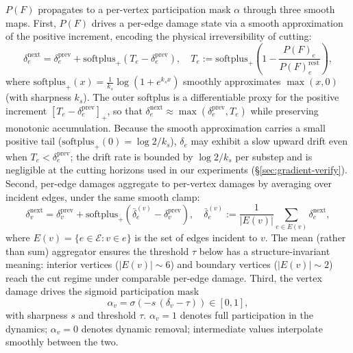 $P(F)$ propagates to a per-vertex participation mask $\alpha$ through
three smooth maps. First, $P(F)$ drives a per-edge damage state via a
smooth approximation of the positive increment, encoding the physical
irreversibility of cutting:
\begin{equation}
  \delta_e^{\text{next}} \!=\! \delta_e^{\text{prev}} +
    \mathrm{softplus}_{\!+}\!\left(T_e - \delta_e^{\text{prev}}\right),
  \quad
  T_e := \mathrm{softplus}_{\!+}\!\left(1 - \frac{P(F)_e}{P(F)_e^{\text{rest}}}\right),
  \label{eq:edge-damage}
\end{equation}
where $\mathrm{softplus}_{\!+}(x) \!=\! \tfrac{1}{k_s}\log(1 + e^{k_s x})$
smoothly approximates $\max(x, 0)$ (with sharpness $k_s$).
The outer softplus is a differentiable proxy for the positive
increment $[T_e - \delta_e^{\text{prev}}]_+$, so that
$\delta_e^{\text{next}} \!\approx\! \max(\delta_e^{\text{prev}}, T_e)$
while preserving monotonic accumulation. Because the smooth
approximation carries a small positive tail
($\mathrm{softplus}_{\!+}(0) \!=\! \log 2 / k_s$), $\delta_e$ may
exhibit a slow upward drift even when $T_e \!<\! \delta_e^{\text{prev}}$;
the drift rate is bounded by $\log 2 / k_s$ per substep and is
negligible at the cutting horizons used in our experiments
(\S\ref{sec:gradient-verify}).
Second, per-edge damages aggregate to per-vertex damages by averaging
over incident edges, under the same smooth clamp:
\begin{equation}
  \delta_v^{\text{next}} \!=\! \delta_v^{\text{prev}} +
    \mathrm{softplus}_{\!+}\!\left(\bar{\delta}_e^{(v)} -
       \delta_v^{\text{prev}}\right),
  \quad
  \bar{\delta}_e^{(v)} := \frac{1}{|E(v)|}
      \sum_{e \in E(v)} \delta_e^{\text{next}},
  \label{eq:vertex-damage}
\end{equation}
where $E(v) = \{e \in \mathcal{E} : v \in e\}$ is the set of edges
incident to $v$. The mean (rather than sum) aggregator ensures the
threshold $\tau$ below has a structure-invariant meaning: interior
vertices ($|E(v)| \!\sim\! 6$) and boundary vertices
($|E(v)| \!\sim\! 2$) reach the cut regime under comparable per-edge
damage. Third, the vertex damage drives the sigmoid participation
mask
\begin{equation}
  \alpha_v \!=\! \sigma\!\left(-s\,(\delta_v - \tau)\right) \in [0, 1],
  \label{eq:soft-removal}
\end{equation}
with sharpness $s$ and threshold $\tau$. $\alpha_v \!=\! 1$ denotes
full participation in the dynamics; $\alpha_v \!=\! 0$ denotes
dynamic removal; intermediate values interpolate smoothly between the
two.

